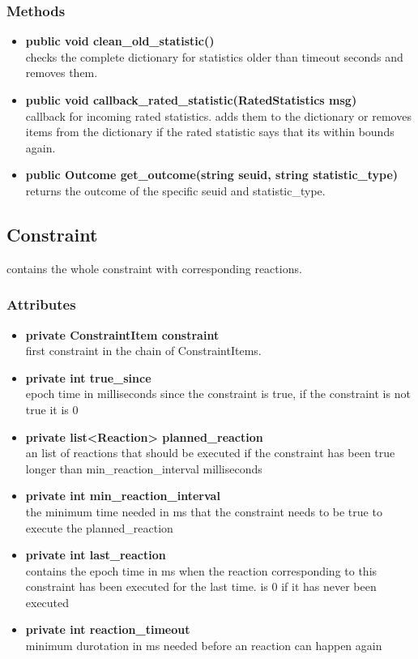 \subsubsection{Methods}
\begin{itemize}
	\item \textbf{ public void clean\_old\_statistic() }\\
		checks the complete dictionary for statistics older than timeout seconds and removes them.
	\item \textbf{ public void callback\_rated\_statistic(RatedStatistics msg) }\\
		callback for incoming rated statistics. adds them to the dictionary or removes items from the dictionary if the rated statistic says that its within bounds again. 
	\item \textbf{ public Outcome get\_outcome(string seuid, string statistic\_type) }\\
		returns the outcome of the specific seuid and statistic\_type.
\end{itemize}

\subsection{Constraint }
contains the whole constraint with corresponding reactions.


\subsubsection{Attributes}
\begin{itemize}
	\item \textbf{ private ConstraintItem constraint }\\
	first constraint in the chain of ConstraintItems.
	\item \textbf{ private int true\_since }\\
	epoch time in milliseconds since the constraint is true,
	if the constraint is not true it is 0
	\item \textbf{ private list<Reaction> planned\_reaction }\\
	an list of reactions that should be executed if the constraint has been true longer than min\_reaction\_interval milliseconds
	\item \textbf{ private int min\_reaction\_interval }\\
	the minimum time needed in ms that the constraint needs to be true to execute the planned\_reaction
	\item \textbf{ private int last\_reaction }\\
	contains the epoch time in ms when the reaction corresponding to this constraint has been executed for the last time.
		is 0 if it has never been executed
	\item \textbf{ private int reaction\_timeout }\\
	minimum durotation in ms needed before an reaction can happen again
\end{itemize}
